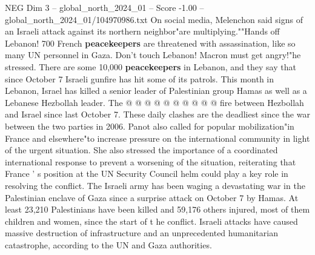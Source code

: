 \begin{textsample}{NEG Dim 3 – global\_north\_2024\_01 – Score -1.00 – global\_north\_2024\_01/104970986.txt}
On social media, Melenchon said signs of an Israeli attack against its northern neighbor"are multiplying.""Hands off Lebanon! 700 French \textbf{peacekeepers} are threatened with assassination, like so many UN personnel in Gaza.
Don't touch Lebanon!
Macron must get angry!"he stressed.
There are some 10,000 \textbf{peacekeepers} in Lebanon, and they say that since October 7 Israeli gunfire has hit some of its patrols.
This month in Lebanon, Israel has killed a senior leader of Palestinian group Hamas as well as a Lebanese Hezbollah leader.
The @ @ @ @ @ @ @ @ @ @ fire between Hezbollah and Israel since last October 7.
These daily clashes are the deadliest since the war between the two parties in 2006.
Panot also called for popular mobilization"in France and elsewhere"to increase pressure on the international community in light of the urgent situation.
She also stressed the importance of a coordinated international response to prevent a worsening of the situation, reiterating that France ' s position at the UN Security Council helm could play a key role in resolving the conflict.
The Israeli army has been waging a devastating war in the Palestinian enclave of Gaza since a surprise attack on October 7 by Hamas.
At least 23,210 Palestinians have been killed and 59,176 others injured, most of them children and women, since the start of t he conflict.
Israeli attacks have caused massive destruction of infrastructure and an unprecedented humanitarian catastrophe, according to the UN and Gaza authorities.

\end{textsample}
